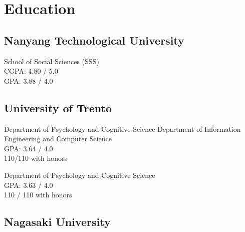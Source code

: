 \documentclass[a4paper]{deedy-resume} %
\begin{document}
%
\begin{minipage}[t]{0.63\textwidth} %


\section{Education} 

\subsection{Nanyang Technological University}
School of Social Sciences (SSS)\\
CGPA: 4.80 / 5.0\\
GPA: 3.88 / 4.0\\
\sectionspace %

\subsection{University of Trento}

Department of Psychology and Cognitive Science
Department of Information Engineering and Computer Science\\
GPA: 3.64 / 4.0\\
110/110 with honors\\

\sectionspace %

Department of Psychology and Cognitive Science\\
GPA: 3.63 / 4.0 \\
110 / 110 with honors\\

\sectionspace %

\subsection{Nagasaki University}


\end{minipage}
\end{document}
